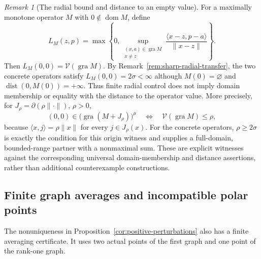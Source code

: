 \documentclass[11pt]{article}
\newcommand{\gra}{\operatorname{gra}}
\newcommand{\dom}{\operatorname{dom}}
\newcommand{\pair}[2]{\langle #1,#2\rangle}
\theoremstyle{definition}
\theoremstyle{remark}
\newtheorem{remark}{Remark}
\newcommand{\dist}{\operatorname{dist}}
\begin{document}
\begin{remark}[The radial bound and distance to an empty value]
\label{rem:radial-distance-recovered}
For a maximally monotone operator $M$ with $0\notin\dom M$, define
\[
L_M(z,p)=\max\left\{0,\sup_{\substack{(x,a)\in\gra M\\x\ne z}}\frac{\pair{x-z}{p-a}}{\|x-z\|}\right\}.
\]
Then $L_M(0,0)=\mathcal V(\gra M)$. By Remark~\ref{rem:sharp-radial-transfer}, the two concrete operators satisfy $L_M(0,0)=2\sigma<\infty$ although $M(0)=\varnothing$ and $\dist(0,M(0))=+\infty$. Thus finite radial control does not imply domain membership or equality with the distance to the operator value. More precisely, for $J_\rho=\partial(\rho\|\cdot\|)$, $\rho>0$,
\[
(0,0)\in\bigl(\gra(M+J_\rho)\bigr)^\mu
\quad\Longleftrightarrow\quad\mathcal V(\gra M)\le\rho,
\]
because $\pair{x}{j}=\rho\|x\|$ for every $j\in J_\rho(x)$. For the concrete operators, $\rho\ge2\sigma$ is exactly the condition for this origin witness and supplies a full-domain, bounded-range partner with a nonmaximal sum. These are explicit witnesses against the corresponding universal domain-membership and distance assertions, rather than additional counterexample constructions.
\end{remark}

\subsection{Finite graph averages and incompatible polar points}
\label{subsec:appendix-graph-averages}

The nonuniqueness in Proposition~\ref{cor:positive-perturbations} also has a finite averaging certificate. It uses two actual points of the first graph and one point of the rank-one graph.
\end{document}
